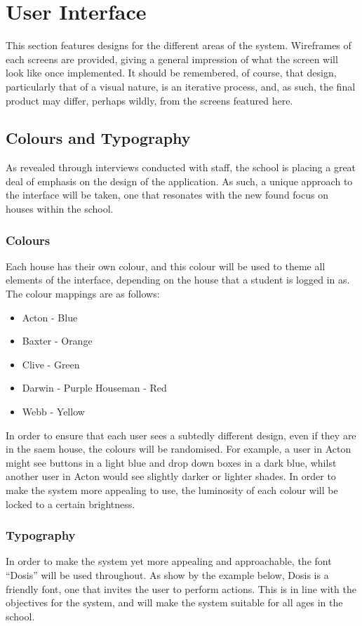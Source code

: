 \section{User Interface}
This section features designs for the different areas of the system. Wireframes of each screens are provided, giving a general impression of what the screen will look like once implemented. It should be remembered, of course, that design, particularly that of a visual nature, is an iterative process, and, as such, the final product may differ, perhaps wildly, from the screens featured here.

\subsection{Colours and Typography}
As revealed through interviews conducted with staff, the school is placing a great deal of emphasis on the design of the application. As such, a unique approach to the interface will be taken, one that resonates with the new found focus on houses within the school. 

\subsubsection{Colours}
Each house has their own colour, and this colour will be used to theme all elements of the interface, depending on the house that a student is logged in as. The colour mappings are as follows:

\begin{itemize}
  \item Acton - Blue
  \item Baxter - Orange
  \item Clive - Green
  \item Darwin - Purple
  \itemm Houseman - Red
  \item Webb - Yellow
\end{itemize}

In order to ensure that each user sees a subtedly different design, even if they are in the saem house, the colours will be randomised. For example, a user in Acton might see buttons in a light blue and drop down boxes in a dark blue, whilst another user in Acton would see slightly darker or lighter shades. In order to make the system more appealing to use, the luminosity of each colour will be locked to a certain brightness.

\subsubsection{Typography}
In order to make the system yet more appealing and approachable, the font ``Dosis'' will be used throughout. As show by the example below, Dosis is a friendly font, one that invites the user to perform actions. This is in line with the objectives for the system, and will make the system suitable for all ages in the school.

